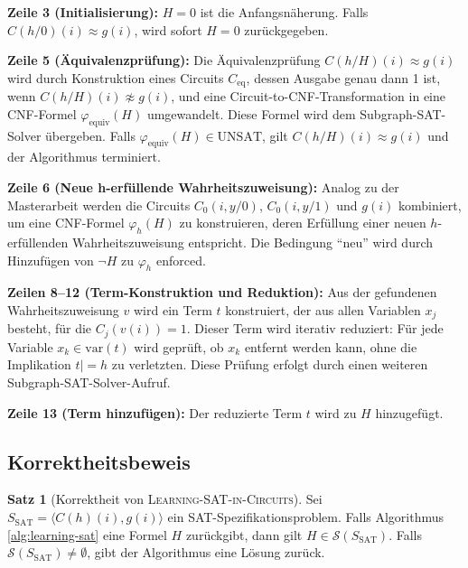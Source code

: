 ﻿\documentclass[a4paper,12pt]{article}
\theoremstyle{definition}
\newtheorem{satz}{Satz}
\begin{document}
\textbf{Zeile 3 (Initialisierung):} $H = 0$ ist die Anfangsnäherung. Falls $C(h/0)(i) \approx g(i)$, wird sofort $H = 0$ zurückgegeben.

\textbf{Zeile 5 (Äquivalenzprüfung):} Die Äquivalenzprüfung $C(h/H)(i) \approx g(i)$ wird durch Konstruktion eines Circuits $C_{\text{eq}}$, dessen Ausgabe genau dann 1 ist, wenn $C(h/H)(i) \not\approx g(i)$, und eine Circuit-to-CNF-Transformation in eine CNF-Formel $\varphi_{\text{equiv}}(H)$ umgewandelt. Diese Formel wird dem Subgraph-SAT-Solver übergeben. Falls $\varphi_{\text{equiv}}(H) \in \text{UNSAT}$, gilt $C(h/H)(i) \approx g(i)$ und der Algorithmus terminiert.

\textbf{Zeile 6 (Neue h-erfüllende Wahrheitszuweisung):} Analog zu der Masterarbeit werden die Circuits $C_0(i, y/0)$, $C_0(i, y/1)$ und $g(i)$ kombiniert, um eine CNF-Formel $\varphi_h(H)$ zu konstruieren, deren Erfüllung einer neuen $h$-erfüllenden Wahrheitszuweisung entspricht. Die Bedingung ``neu'' wird durch Hinzufügen von $\neg H$ zu $\varphi_h$ enforced.

\textbf{Zeilen 8--12 (Term-Konstruktion und Reduktion):} Aus der gefundenen Wahrheitszuweisung $v$ wird ein Term $t$ konstruiert, der aus allen Variablen $x_j$ besteht, für die $C_j(v(i)) = 1$. Dieser Term wird iterativ reduziert: Für jede Variable $x_k \in \text{var}(t)$ wird geprüft, ob $x_k$ entfernt werden kann, ohne die Implikation $t |= h$ zu verletzten. Diese Prüfung erfolgt durch einen weiteren Subgraph-SAT-Solver-Aufruf.

\textbf{Zeile 13 (Term hinzufügen):} Der reduzierte Term $t$ wird zu $H$ hinzugefügt.

\subsection{Korrektheitsbeweis}

\begin{satz}[Korrektheit von \textsc{Learning-SAT-in-Circuits}]
    Sei $S_{\text{SAT}} = \langle C(h)(i), g(i) \rangle$ ein SAT-Spezifikationsproblem. Falls Algorithmus \ref{alg:learning-sat} eine Formel $H$ zurückgibt, dann gilt $H \in \mathcal{S}(S_{\text{SAT}})$. Falls $\mathcal{S}(S_{\text{SAT}}) \neq \emptyset$, gibt der Algorithmus eine Lösung zurück.
\end{satz}
\end{document}

